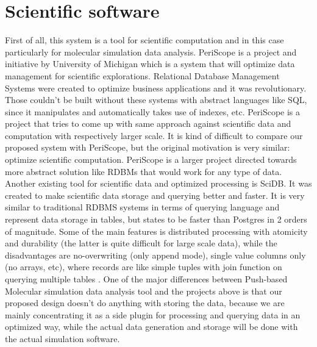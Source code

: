 \documentclass[11pt,a4paper]{report}
\begin{document}
\section{Scientific software}

First of all, this system is a tool for scientific computation and in this case particularly for molecular simulation data analysis. PeriScope is a project and initiative by University of Michigan which is a system that will optimize data management for scientific explorations. Relational Database Management Systems were created to optimize business applications and it was revolutionary. Those couldn't be built without these systems with abstract languages like SQL, since it manipulates and automatically takes use of indexes, etc. PeriScope is a project that tries to come up with same approach against scientific data and computation with respectively larger scale.\cite{PeriScope} It is kind of difficult to compare our proposed system with PeriScope, but the original motivation is very similar: optimize scientific computation. PeriScope is a larger project directed towards more abstract solution like RDBMs that would work for any type of data. Another existing tool for scientific data and optimized processing is SciDB. It was created to make scientific data storage and querying better and faster. It is very similar to traditional RDBMS systems in terms of querying language and represent data storage in tables, but states to be faster than Postgres in 2 orders of magnitude. Some of the main features is distributed processing with atomicity and durability (the latter is quite difficult for large scale data), while the disadvantages are no-overwriting (only append mode), single value columns only (no arrays, etc), where records are like simple tuples with join function on querying multiple tables \cite{SciDB}. One of the major differences between Push-based Molecular simulation data analysis tool and the projects above is that our proposed design doesn't do anything with storing the data, because we are mainly concentrating it as a side plugin for processing and querying data in an optimized way, while the actual data generation and storage will be done with the actual simulation software.
\end{document}
